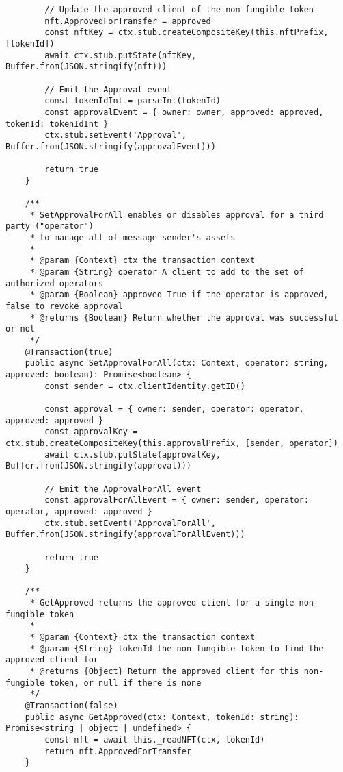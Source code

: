 \begin{lstlisting}
        // Update the approved client of the non-fungible token
        nft.ApprovedForTransfer = approved
        const nftKey = ctx.stub.createCompositeKey(this.nftPrefix, [tokenId])
        await ctx.stub.putState(nftKey, Buffer.from(JSON.stringify(nft)))

        // Emit the Approval event
        const tokenIdInt = parseInt(tokenId)
        const approvalEvent = { owner: owner, approved: approved, tokenId: tokenIdInt }
        ctx.stub.setEvent('Approval', Buffer.from(JSON.stringify(approvalEvent)))

        return true
    }

    /**
     * SetApprovalForAll enables or disables approval for a third party ("operator")
     * to manage all of message sender's assets
     *
     * @param {Context} ctx the transaction context
     * @param {String} operator A client to add to the set of authorized operators
     * @param {Boolean} approved True if the operator is approved, false to revoke approval
     * @returns {Boolean} Return whether the approval was successful or not
     */
    @Transaction(true)
    public async SetApprovalForAll(ctx: Context, operator: string, approved: boolean): Promise<boolean> {
        const sender = ctx.clientIdentity.getID()

        const approval = { owner: sender, operator: operator, approved: approved }
        const approvalKey = ctx.stub.createCompositeKey(this.approvalPrefix, [sender, operator])
        await ctx.stub.putState(approvalKey, Buffer.from(JSON.stringify(approval)))

        // Emit the ApprovalForAll event
        const approvalForAllEvent = { owner: sender, operator: operator, approved: approved }
        ctx.stub.setEvent('ApprovalForAll', Buffer.from(JSON.stringify(approvalForAllEvent)))

        return true
    }

    /**
     * GetApproved returns the approved client for a single non-fungible token
     *
     * @param {Context} ctx the transaction context
     * @param {String} tokenId the non-fungible token to find the approved client for
     * @returns {Object} Return the approved client for this non-fungible token, or null if there is none
     */
    @Transaction(false)
    public async GetApproved(ctx: Context, tokenId: string): Promise<string | object | undefined> {
        const nft = await this._readNFT(ctx, tokenId)
        return nft.ApprovedForTransfer
    }


\end{lstlisting}
